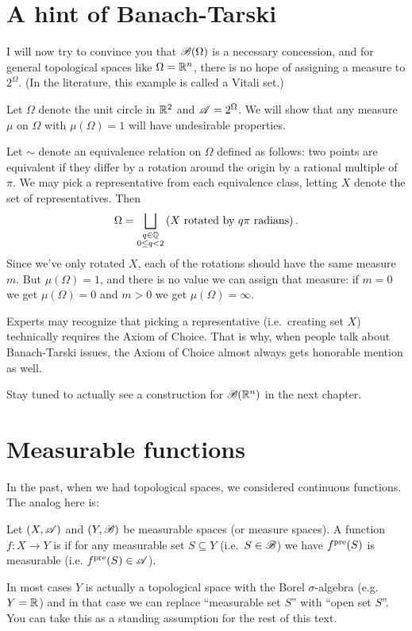 \section{A hint of Banach-Tarski}
I will now try to convince you that $\mathscr B(\Omega)$
is a necessary concession,
and for general topological spaces like $\Omega = \mathbb R^n$,
there is no hope of assigning a measure to $2^{\Omega}$.
(In the literature, this example is called a Vitali set.)
\begin{example}
	[A geometric example why $\SA = 2^\Omega$ is unsuitable]
	Let $\Omega$ denote the unit circle in $\mathbb R^2$
	and $\SA = 2^\Omega$.
	We will show that any measure $\mu$ on $\Omega$
	with $\mu(\Omega) = 1$ will have undesirable properties.

	Let $\sim$ denote an equivalence relation on $\Omega$
	defined as follows: two points are equivalent
	if they differ by a rotation around the origin by a rational multiple of $\pi$.
	We may pick a representative from each equivalence class,
	letting $X$ denote the set of representatives.
	Then
	\[ \Omega = \bigsqcup_{\substack{q \in \mathbb Q \\ 0 \le q < 2}}
		\left( X \text{ rotated by $q\pi$ radians} \right).  \]
	Since we've only rotated $X$,
	each of the rotations should have the same measure $m$.
	But $\mu(\Omega) = 1$,
	and there is no value we can assign that measure:
	if $m = 0$ we get $\mu(\Omega) = 0$
	and $m > 0$ we get $\mu(\Omega) = \infty$.
\end{example}
\begin{remark}
	[Choice]
	Experts may recognize that picking a representative
	(i.e.\ creating set $X$)
	technically requires the Axiom of Choice.
	That is why, when people talk about Banach-Tarski issues,
	the Axiom of Choice almost always gets honorable mention as well.
\end{remark}

Stay tuned to actually see a construction for $\mathscr B(\mathbb R^n)$
in the next chapter.

\section{Measurable functions}
\label{sec:measurable_functions}
In the past, when we had topological spaces,
we considered continuous functions.
The analog here is:
\begin{definition}
	Let $(X, \mathscr A)$ and $(Y, \mathscr B)$ be measurable spaces
	(or measure spaces).
	A function $f \colon X \to Y$ is 
	if for any measurable set $S \subseteq Y$ (i.e.\ $S \in \mathscr B$)
	we have $f^{\text{pre}}(S)$ is measurable (i.e. $f^{\text{pre}}(S) \in \mathscr A$).

  In most cases $Y$ is actually a topological space with the Borel $\sigma$-algebra
  (e.g.\ $Y = \mathbb R$) and in that case we can replace ``measurable set $S$''
  with ``open set $S$''.
  You can take this as a standing assumption for the rest of this text.
\end{definition}

